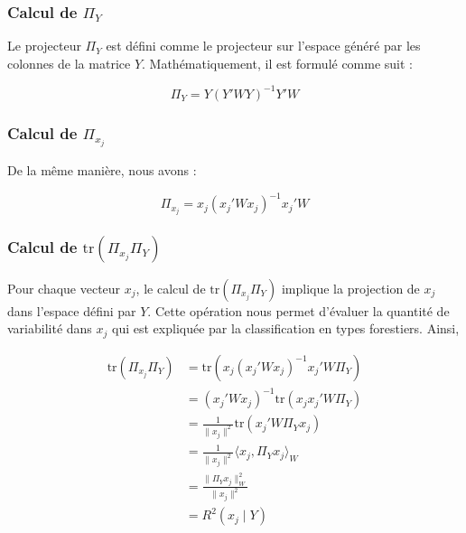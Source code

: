 \documentclass[
]{article}
\begin{document}
\hypertarget{calcul-de-pi_y}{%
\subsubsection{\texorpdfstring{Calcul de
\(\Pi_Y\)}{Calcul de \textbackslash Pi\_Y}}\label{calcul-de-pi_y}}

Le projecteur \(\Pi_Y\) est défini comme le projecteur sur l'espace
généré par les colonnes de la matrice \(Y\). Mathématiquement, il est
formulé comme suit :

\[
   \Pi_Y = Y \left( Y' W Y \right)^{-1} Y' W
   \]

\hypertarget{calcul-de-pi_x_j}{%
\subsubsection{\texorpdfstring{Calcul de
\(\Pi_{x_j}\)}{Calcul de \textbackslash Pi\_\{x\_j\}}}\label{calcul-de-pi_x_j}}

De la même manière, nous avons :

\[
   \Pi_{x_j} = {x_j} \left( {x_j}' W {x_j} \right)^{-1} {x_j}' W
   \]

\hypertarget{calcul-de-texttrpi_x_j-pi_y}{%
\subsubsection{\texorpdfstring{Calcul de
\(\text{tr}(\Pi_{x_j} \Pi_Y)\)}{Calcul de \textbackslash text\{tr\}(\textbackslash Pi\_\{x\_j\} \textbackslash Pi\_Y)}}\label{calcul-de-texttrpi_x_j-pi_y}}

Pour chaque vecteur \(x_j\), le calcul de \(\text{tr}(\Pi_{x_j} \Pi_Y)\)
implique la projection de \(x_j\) dans l'espace défini par \(Y\). Cette
opération nous permet d'évaluer la quantité de variabilité dans \(x_j\)
qui est expliquée par la classification en types forestiers. Ainsi,

\[ 
\begin{aligned} 
\text{tr}(\Pi_{x_j} \Pi_Y) & = \text{tr} ({x_j} \left( {x_j}' W {x_j} \right)^{-1} {x_j}' W \Pi_Y) \\
& = \left( {x_j}' W {x_j} \right)^{-1} \text{tr} ({x_j}{x_j}' W \Pi_Y)\\
& = \frac{1}{\|x_j\|^2}  \text{tr} ({x_j}' W \Pi_Y{x_j})\\
& = \frac{1}{\|x_j\|^2}  \langle x_j, \Pi_Y x_j \rangle_W \\
& = \frac{\|\Pi_Y x_j\|_W^2}{\|x_j\|^2}\\
& = R^2({x_j} \mid Y)
\end{aligned}
\]
\end{document}
